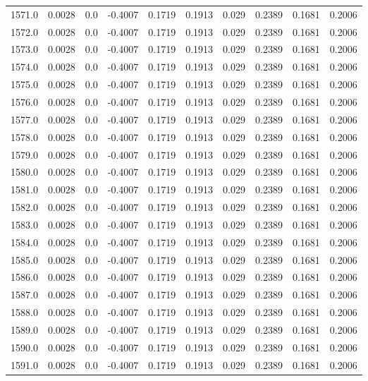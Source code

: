 \begin{longtable}{lrrrrrrrrr}
1571.0 & 0.0028 & 0.0 & -0.4007 & 0.1719 & 0.1913 & 0.029 & 0.2389 & 0.1681 & 0.2006 \\
1572.0 & 0.0028 & 0.0 & -0.4007 & 0.1719 & 0.1913 & 0.029 & 0.2389 & 0.1681 & 0.2006 \\
1573.0 & 0.0028 & 0.0 & -0.4007 & 0.1719 & 0.1913 & 0.029 & 0.2389 & 0.1681 & 0.2006 \\
1574.0 & 0.0028 & 0.0 & -0.4007 & 0.1719 & 0.1913 & 0.029 & 0.2389 & 0.1681 & 0.2006 \\
1575.0 & 0.0028 & 0.0 & -0.4007 & 0.1719 & 0.1913 & 0.029 & 0.2389 & 0.1681 & 0.2006 \\
1576.0 & 0.0028 & 0.0 & -0.4007 & 0.1719 & 0.1913 & 0.029 & 0.2389 & 0.1681 & 0.2006 \\
1577.0 & 0.0028 & 0.0 & -0.4007 & 0.1719 & 0.1913 & 0.029 & 0.2389 & 0.1681 & 0.2006 \\
1578.0 & 0.0028 & 0.0 & -0.4007 & 0.1719 & 0.1913 & 0.029 & 0.2389 & 0.1681 & 0.2006 \\
1579.0 & 0.0028 & 0.0 & -0.4007 & 0.1719 & 0.1913 & 0.029 & 0.2389 & 0.1681 & 0.2006 \\
1580.0 & 0.0028 & 0.0 & -0.4007 & 0.1719 & 0.1913 & 0.029 & 0.2389 & 0.1681 & 0.2006 \\
1581.0 & 0.0028 & 0.0 & -0.4007 & 0.1719 & 0.1913 & 0.029 & 0.2389 & 0.1681 & 0.2006 \\
1582.0 & 0.0028 & 0.0 & -0.4007 & 0.1719 & 0.1913 & 0.029 & 0.2389 & 0.1681 & 0.2006 \\
1583.0 & 0.0028 & 0.0 & -0.4007 & 0.1719 & 0.1913 & 0.029 & 0.2389 & 0.1681 & 0.2006 \\
1584.0 & 0.0028 & 0.0 & -0.4007 & 0.1719 & 0.1913 & 0.029 & 0.2389 & 0.1681 & 0.2006 \\
1585.0 & 0.0028 & 0.0 & -0.4007 & 0.1719 & 0.1913 & 0.029 & 0.2389 & 0.1681 & 0.2006 \\
1586.0 & 0.0028 & 0.0 & -0.4007 & 0.1719 & 0.1913 & 0.029 & 0.2389 & 0.1681 & 0.2006 \\
1587.0 & 0.0028 & 0.0 & -0.4007 & 0.1719 & 0.1913 & 0.029 & 0.2389 & 0.1681 & 0.2006 \\
1588.0 & 0.0028 & 0.0 & -0.4007 & 0.1719 & 0.1913 & 0.029 & 0.2389 & 0.1681 & 0.2006 \\
1589.0 & 0.0028 & 0.0 & -0.4007 & 0.1719 & 0.1913 & 0.029 & 0.2389 & 0.1681 & 0.2006 \\
1590.0 & 0.0028 & 0.0 & -0.4007 & 0.1719 & 0.1913 & 0.029 & 0.2389 & 0.1681 & 0.2006 \\
1591.0 & 0.0028 & 0.0 & -0.4007 & 0.1719 & 0.1913 & 0.029 & 0.2389 & 0.1681 & 0.2006 \\

\end{longtable}
